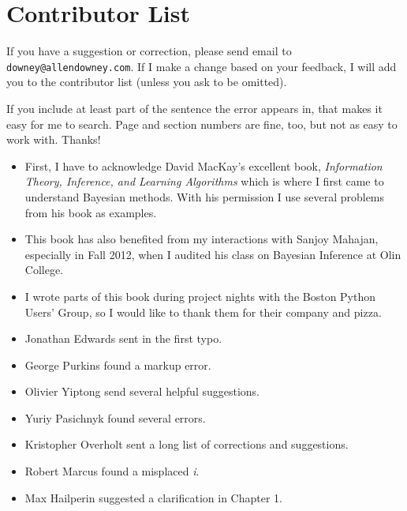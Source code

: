 \documentclass[12pt]{book}
\begin{document}
\section*{Contributor List}

If you have a suggestion or correction, please send email to 
{\tt downey@allendowney.com}.  If I make a change based on your
feedback, I will add you to the contributor list
(unless you ask to be omitted).

If you include at least part of the sentence the
error appears in, that makes it easy for me to search.  Page and
section numbers are fine, too, but not as easy to work with.
Thanks!

\small

\begin{itemize}

\item First, I have to acknowledge David MacKay's excellent book,
  {\it Information Theory, Inference, and Learning Algorithms} which is
  where I first came to understand Bayesian methods.  With his
  permission I use several problems from
  his book as examples.

\item This book has also benefited from my interactions with Sanjoy
  Mahajan, especially in Fall 2012, when I audited his class on
  Bayesian Inference at Olin College.

\item I wrote parts of this book during project nights with the Boston
  Python Users' Group, so I would like to thank them for their
  company and pizza.

\item Jonathan Edwards sent in the first typo.

\item George Purkins found a markup error.

\item Olivier Yiptong send several helpful suggestions.

\item Yuriy Pasichnyk found several errors.

\item Kristopher Overholt sent a long list of corrections and suggestions.

\item Robert Marcus found a misplaced {\it i}.

\item Max Hailperin suggested a clarification in Chapter 1.


\end{itemize}
\end{document}
